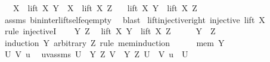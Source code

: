 \begin{isabellebody}
\ \ \ {\isachardoublequoteopen}X\ {\isasymunion}\ lift\ X\ Y\ {\isacharequal}{\kern0pt}\ X\ {\isasymunion}\ lift\ X\ Z{\isachardoublequoteclose}\isanewline
\ \ \ {\isachardoublequoteopen}lift\ X\ Y\ {\isacharequal}{\kern0pt}\ lift\ X\ Z{\isachardoublequoteclose}\isanewline
%
\isadelimproof
\ \ %
\endisadelimproof
%
\isatagproof
{}\isamarkupfalse%
\ assms\ bin{\isacharunderscore}{\kern0pt}inter{\isacharunderscore}{\kern0pt}lift{\isacharunderscore}{\kern0pt}self{\isacharunderscore}{\kern0pt}eq{\isacharunderscore}{\kern0pt}empty\ \isamarkupfalse%
\ blast%
\endisatagproof
{\isafoldproof}%
%
\isadelimproof
%
\endisadelimproof
%
\isadelimdocument
%
\endisadelimdocument
%
\isatagdocument
%
\isamarkuptrue%
%
\endisatagdocument
{\isafolddocument}%
%
\isadelimdocument
%
\endisadelimdocument
{}\isamarkupfalse%
\ lift{\isacharunderscore}{\kern0pt}injective{\isacharunderscore}{\kern0pt}right{\isacharcolon}{\kern0pt}\ {\isachardoublequoteopen}injective\ {\isacharparenleft}{\kern0pt}lift\ X{\isacharparenright}{\kern0pt}{\isachardoublequoteclose}\isanewline
%
\isadelimproof
%
\endisadelimproof
%
\isatagproof
{}\isamarkupfalse%
\ {\isacharparenleft}{\kern0pt}rule\ injectiveI{\isacharparenright}{\kern0pt}\isanewline
\ \ \isamarkupfalse%
\ Y\ Z\ \isamarkupfalse%
\ {\isachardoublequoteopen}lift\ X\ Y\ {\isacharequal}{\kern0pt}\ lift\ X\ Z{\isachardoublequoteclose}\isanewline
\ \ \isamarkupfalse%
\ \isamarkupfalse%
\ {\isachardoublequoteopen}Y\ {\isacharequal}{\kern0pt}\ Z{\isachardoublequoteclose}\isanewline
\ \ \isamarkupfalse%
\ {\isacharparenleft}{\kern0pt}induction\ Y\ arbitrary{\isacharcolon}{\kern0pt}\ Z\ rule{\isacharcolon}{\kern0pt}\ mem{\isacharunderscore}{\kern0pt}induction{\isacharparenright}{\kern0pt}\isanewline
\ \ \ \ \isamarkupfalse%
\ {\isacharparenleft}{\kern0pt}mem\ Y{\isacharparenright}{\kern0pt}\isanewline
\ \ \ \ \isacommand{{\isacharbraceleft}{\kern0pt}}\isamarkupfalse%
\isanewline
\ \ \ \ \ \ \isamarkupfalse%
\ U\ V\ u\ \isamarkupfalse%
\ uvassms{\isacharcolon}{\kern0pt}\ {\isachardoublequoteopen}U\ {\isasymin}\ {\isacharbraceleft}{\kern0pt}Y{\isacharcomma}{\kern0pt}\ Z{\isacharbraceright}{\kern0pt}{\isachardoublequoteclose}\ {\isachardoublequoteopen}V\ {\isasymin}\ {\isacharbraceleft}{\kern0pt}Y{\isacharcomma}{\kern0pt}\ Z{\isacharbraceright}{\kern0pt}{\isachardoublequoteclose}\ {\isachardoublequoteopen}U\ {\isasymnoteq}\ V{\isachardoublequoteclose}\ {\isachardoublequoteopen}u\ {\isasymin}\ U{\isachardoublequoteclose}\isanewline

\end{isabellebody}
